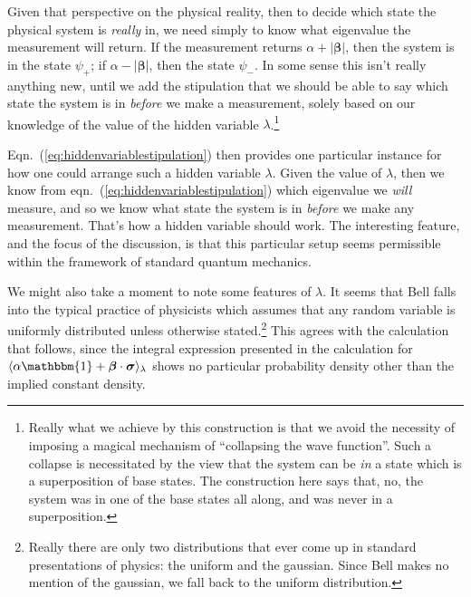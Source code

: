 \documentclass[12pt]{article}
\begin{document}
Given that perspective on the physical reality, then to decide which state the physical system is \emph{really} in, we need simply to know what eigenvalue the measurement will return.  If the measurement returns $\alpha + |\bm{\beta}|$, then the system is in the state $\psi_{+}$; if $\alpha - |\bm{\beta}|$, then the state $\psi_{-}$.  In some sense this isn't really anything new, until we add the stipulation that we should be able to say which state the system is in \emph{before} we make a measurement, solely based on our knowledge of the value of the hidden variable $\lambda$.\footnote{Really what we achieve by this construction is that we avoid the necessity of imposing a magical mechanism of ``collapsing the wave function''.  Such a collapse is necessitated by the view that the system can be \emph{in} a state which is a superposition of base states.  The construction here says that, no, the system was in one of the base states all along, and was never in a superposition.}

Eqn.~(\ref{eq:hiddenvariablestipulation}) then provides one particular instance for how one could arrange such a hidden variable $\lambda$.  Given the value of $\lambda$, then we know from eqn.~(\ref{eq:hiddenvariablestipulation}) which eigenvalue we \emph{will} measure, and so we know what state the system is in \emph{before} we make any measurement.  That's how a hidden variable should work.  The interesting feature, and the focus of the discussion, is that this particular setup seems permissible within the framework of standard quantum mechanics.

We might also take a moment to note some features of $\lambda$.  It seems that Bell falls into the typical practice of physicists which assumes that any random variable is uniformly distributed unless otherwise stated.\footnote{Really there are only two distributions that ever come up in standard presentations of physics: the uniform and the gaussian.  Since Bell makes no mention of the gaussian, we fall back to the uniform distribution.}  This agrees with the calculation that follows, since the integral expression presented in the calculation for $\langle \alpha \mathbbm{1} + \bm{\beta} \cdot \bm{\sigma} \rangle_{\lambda}$ shows no particular probability density other than the implied constant density.



\end{document}

